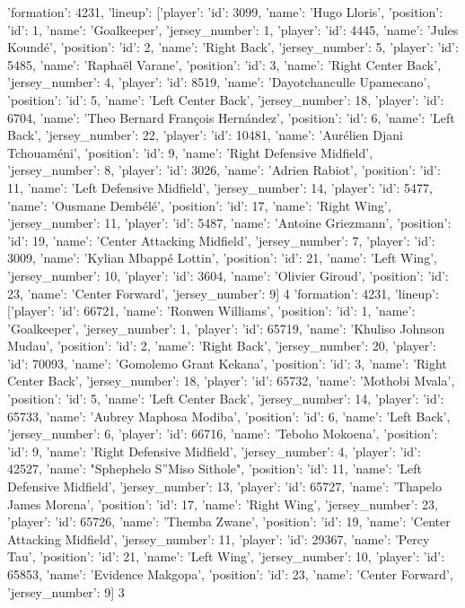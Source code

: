 {'formation': 4231, 'lineup': [{'player': {'id': 3099, 'name': 'Hugo Lloris'}, 'position': {'id': 1, 'name': 'Goalkeeper'}, 'jersey_number': 1}, {'player': {'id': 4445, 'name': 'Jules Koundé'}, 'position': {'id': 2, 'name': 'Right Back'}, 'jersey_number': 5}, {'player': {'id': 5485, 'name': 'Raphaël Varane'}, 'position': {'id': 3, 'name': 'Right Center Back'}, 'jersey_number': 4}, {'player': {'id': 8519, 'name': 'Dayotchanculle Upamecano'}, 'position': {'id': 5, 'name': 'Left Center Back'}, 'jersey_number': 18}, {'player': {'id': 6704, 'name': 'Theo Bernard François Hernández'}, 'position': {'id': 6, 'name': 'Left Back'}, 'jersey_number': 22}, {'player': {'id': 10481, 'name': 'Aurélien Djani Tchouaméni'}, 'position': {'id': 9, 'name': 'Right Defensive Midfield'}, 'jersey_number': 8}, {'player': {'id': 3026, 'name': 'Adrien Rabiot'}, 'position': {'id': 11, 'name': 'Left Defensive Midfield'}, 'jersey_number': 14}, {'player': {'id': 5477, 'name': 'Ousmane Dembélé'}, 'position': {'id': 17, 'name': 'Right Wing'}, 'jersey_number': 11}, {'player': {'id': 5487, 'name': 'Antoine Griezmann'}, 'position': {'id': 19, 'name': 'Center Attacking Midfield'}, 'jersey_number': 7}, {'player': {'id': 3009, 'name': 'Kylian Mbappé Lottin'}, 'position': {'id': 21, 'name': 'Left Wing'}, 'jersey_number': 10}, {'player': {'id': 3604, 'name': 'Olivier Giroud'}, 'position': {'id': 23, 'name': 'Center Forward'}, 'jersey_number': 9}]}                                     4
{'formation': 4231, 'lineup': [{'player': {'id': 66721, 'name': 'Ronwen Williams'}, 'position': {'id': 1, 'name': 'Goalkeeper'}, 'jersey_number': 1}, {'player': {'id': 65719, 'name': 'Khuliso Johnson Mudau'}, 'position': {'id': 2, 'name': 'Right Back'}, 'jersey_number': 20}, {'player': {'id': 70093, 'name': 'Gomolemo Grant Kekana'}, 'position': {'id': 3, 'name': 'Right Center Back'}, 'jersey_number': 18}, {'player': {'id': 65732, 'name': 'Mothobi Mvala'}, 'position': {'id': 5, 'name': 'Left Center Back'}, 'jersey_number': 14}, {'player': {'id': 65733, 'name': 'Aubrey Maphosa Modiba'}, 'position': {'id': 6, 'name': 'Left Back'}, 'jersey_number': 6}, {'player': {'id': 66716, 'name': 'Teboho Mokoena'}, 'position': {'id': 9, 'name': 'Right Defensive Midfield'}, 'jersey_number': 4}, {'player': {'id': 42527, 'name': "Sphephelo S''Miso Sithole"}, 'position': {'id': 11, 'name': 'Left Defensive Midfield'}, 'jersey_number': 13}, {'player': {'id': 65727, 'name': 'Thapelo James Morena'}, 'position': {'id': 17, 'name': 'Right Wing'}, 'jersey_number': 23}, {'player': {'id': 65726, 'name': 'Themba Zwane'}, 'position': {'id': 19, 'name': 'Center Attacking Midfield'}, 'jersey_number': 11}, {'player': {'id': 29367, 'name': 'Percy Tau'}, 'position': {'id': 21, 'name': 'Left Wing'}, 'jersey_number': 10}, {'player': {'id': 65853, 'name': 'Evidence Makgopa'}, 'position': {'id': 23, 'name': 'Center Forward'}, 'jersey_number': 9}]}                                  3

